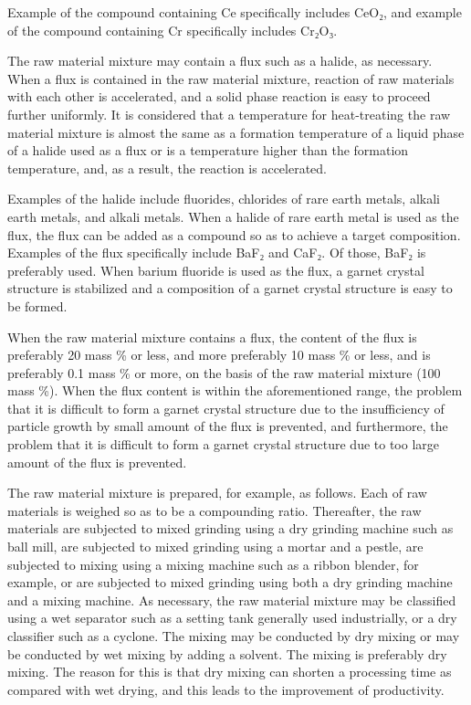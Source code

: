 \documentclass[11pt,a4paper]{article}
\begin{document}
Example of the compound containing Ce specifically includes CeO₂, and example of the compound containing Cr specifically includes Cr₂O₃.

The raw material mixture may contain a flux such as a halide, as necessary. When a flux is contained in the raw material mixture, reaction of raw materials with each other is accelerated, and a solid phase reaction is easy to proceed further uniformly. It is considered that a temperature for heat-treating the raw material mixture is almost the same as a formation temperature of a liquid phase of a halide used as a flux or is a temperature higher than the formation temperature, and, as a result, the reaction is accelerated.

Examples of the halide include fluorides, chlorides of rare earth metals, alkali earth metals, and alkali metals. When a halide of rare earth metal is used as the flux, the flux can be added as a compound so as to achieve a target composition. Examples of the flux specifically include BaF₂ and CaF₂. Of those, BaF₂ is preferably used. When barium fluoride is used as the flux, a garnet crystal structure is stabilized and a composition of a garnet crystal structure is easy to be formed.

When the raw material mixture contains a flux, the content of the flux is preferably 20 mass \% or less, and more preferably 10 mass \% or less, and is preferably 0.1 mass \% or more, on the basis of the raw material mixture (100 mass \%). When the flux content is within the aforementioned range, the problem that it is difficult to form a garnet crystal structure due to the insufficiency of particle growth by small amount of the flux is prevented, and furthermore, the problem that it is difficult to form a garnet crystal structure due to too large amount of the flux is prevented.

The raw material mixture is prepared, for example, as follows. Each of raw materials is weighed so as to be a compounding ratio. Thereafter, the raw materials are subjected to mixed grinding using a dry grinding machine such as ball mill, are subjected to mixed grinding using a mortar and a pestle, are subjected to mixing using a mixing machine such as a ribbon blender, for example, or are subjected to mixed grinding using both a dry grinding machine and a mixing machine. As necessary, the raw material mixture may be classified using a wet separator such as a setting tank generally used industrially, or a dry classifier such as a cyclone. The mixing may be conducted by dry mixing or may be conducted by wet mixing by adding a solvent. The mixing is preferably dry mixing. The reason for this is that dry mixing can shorten a processing time as compared with wet drying, and this leads to the improvement of productivity.
\end{document}
